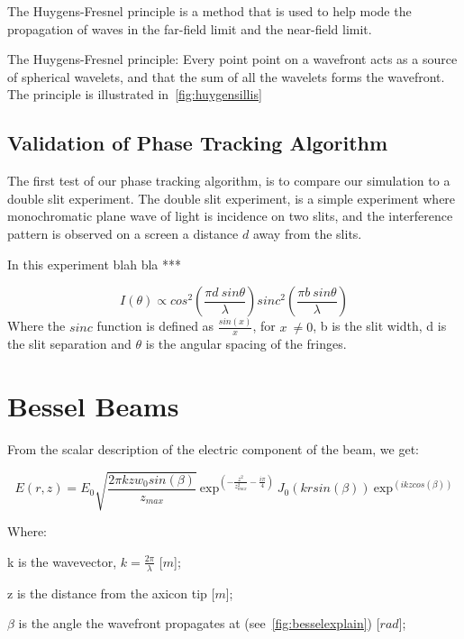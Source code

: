 The Huygens-Fresnel principle is a method that is used to help mode the propagation of waves in the far-field limit and the near-field limit. 

The Huygens-Fresnel principle: Every point point on a wavefront acts as a source of spherical wavelets, and that the sum of all the wavelets forms the wavefront. The principle is illustrated in~\cref{fig:huygensillis}


\subsection{Validation of Phase Tracking Algorithm}

The first test of our phase tracking algorithm, is to compare our simulation to a double slit experiment.
The double slit experiment, is a simple experiment where monochromatic plane wave of light is incidence on two slits, and the interference pattern is observed on a screen a distance $d$ away from the slits.

In this experiment blah bla ***

\begin{equation}
    I(\theta) \propto cos^2\left(\frac{\pi d\ sin \theta}{\lambda}\right)sinc^2\left(\frac{\pi b\ sin\theta}{\lambda}\right)
\end{equation}
Where the $sinc$ function is defined as $\tfrac{sin(x)}{x}$, for $x\ \neq 0$, b is the slit width, d is the slit separation and $\theta$ is the angular spacing of the fringes.

\section{Bessel Beams}


From the scalar description of the electric component of the beam, we get:

\begin{equation}
    E(r,z)=E_0\sqrt{\frac{2\pi k z w_0sin(\beta)}{z_{max}}}\ \text{exp}^{\left(-\frac{z^2}{z_{max}^2}-\frac{i\pi}{4}\right)}\ J_0\left(krsin(\beta)\right)\ \text{exp}^{\left(ikzcos(\beta)\right)}
    \label{eqn:besselEfield}
\end{equation}

\noindent Where:

    \indent k is the wavevector, $k=\tfrac{2\pi}{\lambda}$ [$m$];

    \indent z is the distance from the axicon tip [$m$]; 

    \indent $\beta$ is the angle the wavefront propagates at (see~\cref{fig:besselexplain}) [$rad$]; 

